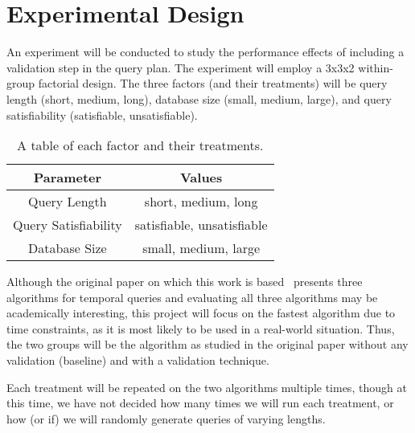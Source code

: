\documentclass[10pt, journal]{IEEEtran}
\begin{document}
\section{Experimental Design}
An experiment will be conducted to study the performance effects of including a validation step in the query plan. The experiment will employ a 3x3x2 within-group factorial design. The three factors (and their treatments) will be query length (short, medium, long), database size (small, medium, large), and query satisfiability (satisfiable, unsatisfiable). 

\begin{table}\centering
\begin{tabular}{|c|c|}\hline
\textbf{Parameter} & \textbf{Values}\\\hline
Query Length & {short, medium, long}\\\hline
Query Satisfiability & {satisfiable, unsatisfiable}\\\hline
Database Size & {small, medium, large}\\\hline
\end{tabular}
\caption{A table of each factor and their treatments.}\label{tab:factors}
\end{table}

Although the original paper on which this work is based~\cite{Li:2011} presents three algorithms for temporal queries and evaluating all three algorithms may be academically interesting, this project will focus on the fastest algorithm due to time constraints, as it is most likely to be used in a real-world situation. Thus, the two groups will be the algorithm as studied in the original paper without any validation (baseline) and with a validation technique. 

Each treatment will be repeated on the two algorithms multiple times, though at this time, we have not decided how many times we will run each treatment, or how (or if) we will randomly generate queries of varying lengths.



\end{document}
